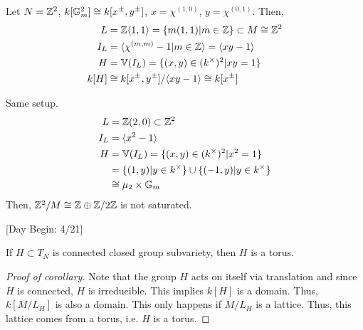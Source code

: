 \documentclass[12pt]{amsart}
\begin{document}
\begin{example}
    Let $N = \mathbb Z^2$, $k[\mathbb G_m^2] \cong k[x^\pm, y^\pm]$, $x = \chi^{(1, 0)}$, $y = \chi^{(0, 1)}$. Then, 
    \begin{align*}
        L &= \mathbb Z\langle 1, 1 \rangle  = \{ m(1,1) | m \in \mathbb Z \}\subset M \cong \mathbb Z^2 \\
        I_L &= \langle \chi^{(m, m)} - 1 | m \in \mathbb Z \rangle = \langle xy-1 \rangle \\
        H &= \mathbb V(I_L) = \{(x,y) \in (k^\times)^2 | xy = 1\} \\
        k[H] &\cong k[x^\pm, y^\pm]/\langle xy-1 \rangle \cong k[x^\pm]
    \end{align*}
\end{example}

\begin{example}
    Same setup. 
    \begin{align*}
        L &= \mathbb Z(2,0) \subset \mathbb Z^2 \\
        I_L &= \langle x^2-1\rangle \\
        H &= \mathbb V(I_L) = \{ (x,y) \in (k^\times)^2 | x^2 = 1\} \\
        &= \{(1,y) | y \in k^\times\} \cup \{(-1,y) | y \in k^\times\} \\
        &\cong \mu_2 \times \mathbb G_m
    \end{align*}
    Then, $\mathbb Z^2/M \cong \mathbb Z \oplus \mathbb Z/2\mathbb Z$ is not saturated. 
\end{example}

[Day Begin: 4/21]
\begin{corollary}
    If $H \subset T_N$ is connected closed group subvariety, then $H$ is a torus. 
\end{corollary}
\begin{proof}[Proof of corollary]
    Note that the group $H$ acts on itself via translation and since $H$ is connected, $H$ is irreducible. This implies $k[H]$ is a domain. Thus, $k[M/L_H]$ is also a domain. This only happens if $M/L_H$ is a lattice. Thus, this lattice comes from a torus, i.e. $H$ is a torus. 
\end{proof}
\end{document}
